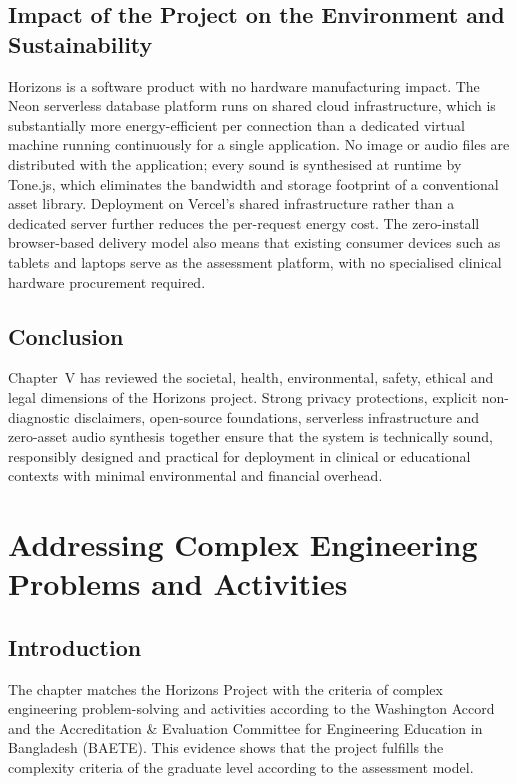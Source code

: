 \documentclass[12pt,a4paper,oneside]{report}
\begin{document}
\section{Impact of the Project on the Environment and Sustainability}

Horizons is a software product with no hardware manufacturing impact. The Neon serverless database platform runs on shared cloud infrastructure, which is substantially more energy-efficient per connection than a dedicated virtual machine running continuously for a single application. No image or audio files are distributed with the application; every sound is synthesised at runtime by Tone.js, which eliminates the bandwidth and storage footprint of a conventional asset library. Deployment on Vercel's shared infrastructure rather than a dedicated server further reduces the per-request energy cost. The zero-install browser-based delivery model also means that existing consumer devices such as tablets and laptops serve as the assessment platform, with no specialised clinical hardware procurement required.

\section{Conclusion}

Chapter~V has reviewed the societal, health, environmental, safety, ethical and legal dimensions of the Horizons project. Strong privacy protections, explicit non-diagnostic disclaimers, open-source foundations, serverless infrastructure and zero-asset audio synthesis together ensure that the system is technically sound, responsibly designed and practical for deployment in clinical or educational contexts with minimal environmental and financial overhead.

\clearpage
\chapter{Addressing Complex Engineering Problems and Activities}

\section{Introduction}

The chapter matches the Horizons Project with the criteria of complex engineering problem-solving and activities according to the Washington Accord and the Accreditation \& Evaluation Committee for Engineering Education in Bangladesh (BAETE). This evidence shows that the project fulfills the complexity criteria of the graduate level according to the assessment model.
\end{document}
